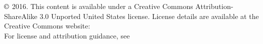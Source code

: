 \chapter*{}
\vfill


\noindent $\copyright$ 2016. This content is available under a Creative Commons Attribution-ShareAlike 3.0 Unported United States license. License details are available at the Creative Commons website:  \\

\noindent For license and attribution guidance, see 
